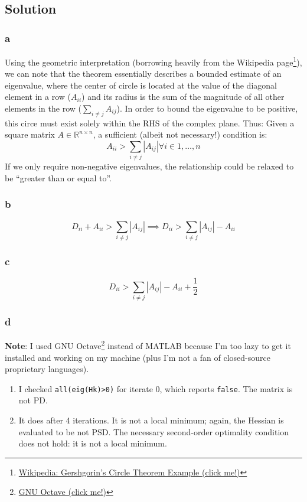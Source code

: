 \documentclass[11pt]{report}
\theoremstyle{definition}
\begin{document}
\subsection*{Solution}
\subsubsection*{a}
Using the geometric interpretation (borrowing heavily from the Wikipedia page\footnote{
	\href{https://en.wikipedia.org/wiki/Gershgorin_circle_theorem\#Example}
	{Wikipedia: Gershgorin's Circle Theorem Example (click me!)}
}), we can note that the theorem essentially describes a bounded estimate of an
eigenvalue, where the center of circle is located at the value of the diagonal
element in a row ($A_{ii}$) and its radius is the sum of the magnitude of all
other elements in the row ($\sum_{i\neq j}A_{ij}$). In order to bound the
eigenvalue to be positive, this circe must exist solely within the RHS of the
complex plane. Thus: Given a square matrix $A\in\mathbb{R}^{n\times n}$, a
sufficient (albeit not necessary!) condition is:
\[ A_{ii} > \sum_{i\neq j}|A_{ij}| \forall i \in 1,\ldots,n \]
If we only require non-negative eigenvalues, the relationship could be relaxed
to be ``greater than or equal to''.

\subsubsection*{b}
\[
	D_{ii} + A_{ii} > \sum_{i\neq j}|A_{ij}|
	\implies D_{ii} > \sum_{i\neq j}|A_{ij}| - A_{ii}
\]

\subsubsection*{c}
\[
	D_{ii} > \sum_{i\neq j}|A_{ij}| - A_{ii} + \frac{1}{2}
\]
\subsubsection*{d}
\textbf{Note}: I used GNU Octave\footnote{\href{https://octave.org/}{GNU Octave (click me!)}}
instead of MATLAB because I'm too lazy to get it installed and working on my machine (plus
I'm not a fan of closed-source proprietary languages).
\begin{enumerate}
	\item I checked \lstinline{all(eig(Hk)>0)} for iterate 0, which reports
	      \lstinline{false}. The matrix is not PD.
	\item It does after 4 iterations. It is not a local minimum; again, the
	      Hessian is evaluated to be not PSD. The necessary second-order optimality
	      condition does not hold: it is not a local minimum.
\end{enumerate}



\end{document}
